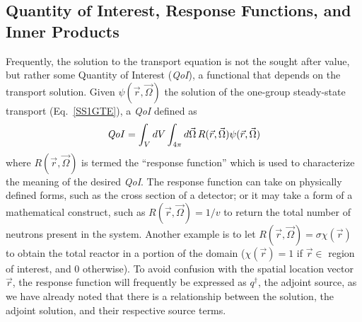 \documentclass[12pt]{report}
\newcommand{\vr}{\vec{r}}
\newcommand{\vO}{\vec{\Omega}}
\newcommand{\qoi}{{\it QoI}\xspace}
\begin{document}
\subsection{Quantity of Interest, Response Functions, and Inner Products}
Frequently, the solution to the transport equation is not the sought after value, but rather some Quantity of Interest (\qoi), a functional that depends on the transport solution. Given $\psi(\vr,\vO)$ the solution of the one-group steady-state transport (Eq.~\eqref{SS1GTE}), a \qoi
defined as
\begin{equation}
\qoi =  \int_V dV \int_{4 \pi} d \vO \,  R(\vr, \vO) \psi(\vr, \vO)
\end{equation}
where $R(\vr, \vO)$ is termed the ``response function'' which is used to characterize the meaning of the desired \qoi. The response function can take on physically defined forms, such as the cross section of a detector; or it may take a form of a mathematical construct, such as $R(\vr, \vO)=1/v$ to return the total number of neutrons present in the system. Another example is to let $R(\vr, \vO)=\sigma \chi(\vr)$ to obtain the total reactor in a portion of the domain ($\chi(\vr)=1$ if $\vr \in$ region of interest, and 0 otherwise). To avoid confusion with the spatial location vector $\vr$, the response function will frequently be expressed as $q^\dag$, the adjoint source, as we have already noted that there is a relationship between the solution, the adjoint solution, and their respective source terms. 
\end{document}
